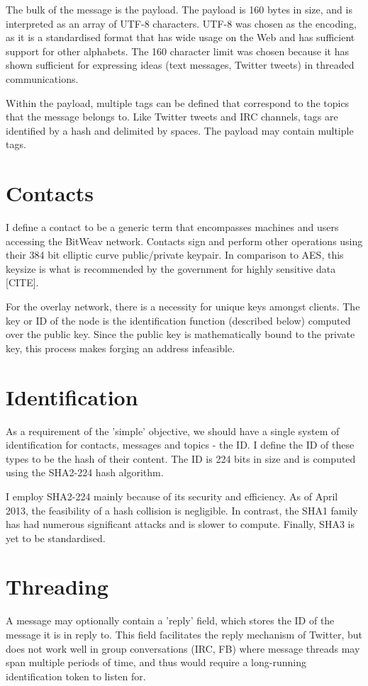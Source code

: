 \documentclass[10pt,a4paper,onecolumn]{article}
\begin{document}
The bulk of the message is the payload. The payload is 160 bytes in size, and is interpreted as an array of UTF-8 characters. UTF-8 was chosen as the encoding, as it is a standardised format that has wide usage on the Web and has sufficient support for other alphabets. The 160 character limit was chosen because it has shown sufficient for expressing ideas (text messages, Twitter tweets) in threaded communications. 

Within the payload, multiple tags can be defined that correspond to the topics that the message belongs to. Like Twitter tweets and IRC channels, tags are identified by a hash and delimited by spaces. The payload may contain multiple tags.


\section{Contacts}
I define a contact to be a generic term that encompasses machines and users accessing the BitWeav network. Contacts sign and perform other operations using their 384 bit elliptic curve public/private keypair. In comparison to AES, this keysize is what is recommended by the government for highly sensitive data [CITE].

For the overlay network, there is a necessity for unique keys amongst clients. The key or ID of the node is the identification function (described below) computed over the public key. Since the public key is mathematically bound to the private key, this process makes forging an address infeasible.


\section{Identification}
As a requirement of the 'simple' objective, we should have a single system of identification for contacts, messages and topics - the ID. I define the ID of these types to be the hash of their content. The ID is 224 bits in size and is computed using the SHA2-224 hash algorithm.

I employ SHA2-224 mainly because of its security and efficiency. As of April 2013, the feasibility of a hash collision is negligible. In contrast, the SHA1 family has had numerous significant attacks and is slower to compute. Finally, SHA3 is yet to be standardised. 


\section{Threading}
A message may optionally contain a 'reply' field, which stores the ID of the message it is in reply to. This field facilitates the reply mechanism of Twitter, but does not work well in group conversations (IRC, FB) where message threads may span multiple periods of time, and thus would require a long-running identification token to listen for.
\end{document}
